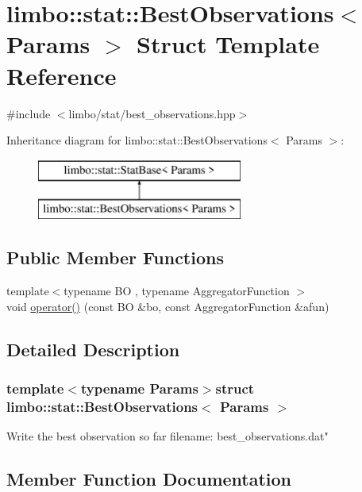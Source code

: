 \hypertarget{structlimbo_1_1stat_1_1_best_observations}{}\section{limbo\+:\+:stat\+:\+:Best\+Observations$<$ Params $>$ Struct Template Reference}
\label{structlimbo_1_1stat_1_1_best_observations}


{\ttfamily \#include $<$limbo/stat/best\+\_\+observations.\+hpp$>$}

Inheritance diagram for limbo\+:\+:stat\+:\+:Best\+Observations$<$ Params $>$\+:\begin{figure}[H]
\begin{center}
\leavevmode
\includegraphics[height=2.000000cm]{structlimbo_1_1stat_1_1_best_observations}
\end{center}
\end{figure}
\subsection*{Public Member Functions}
\begin{DoxyCompactItemize}
\item 
{\footnotesize template$<$typename B\+O , typename Aggregator\+Function $>$ }\\void \hyperlink{structlimbo_1_1stat_1_1_best_observations_aab6d5545f02eca0fd147c79b64f4a3f9}{operator()} (const B\+O \&bo, const Aggregator\+Function \&afun)
\end{DoxyCompactItemize}


\subsection{Detailed Description}
\subsubsection*{template$<$typename Params$>$struct limbo\+::stat\+::\+Best\+Observations$<$ Params $>$}

Write the best observation so far filename\+: {\ttfamily best\+\_\+observations.\+dat"} 

\subsection{Member Function Documentation}
\hypertarget{structlimbo_1_1stat_1_1_best_observations_aab6d5545f02eca0fd147c79b64f4a3f9}{}
